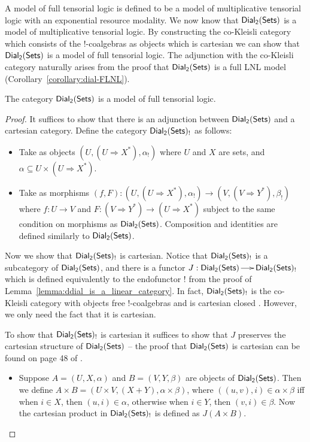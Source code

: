 A model of full tensorial logic is defined to be a model of
multiplicative tensorial logic with an exponential resource modality. We
now know that $\mathsf{Dial_2}(\mathsf{Sets})$ is a model of multiplicative tensorial logic.  By
constructing the co-Kleisli category which consists of the
$!$-coalgebras as objects which is cartesian we can show that $\mathsf{Dial_2}(\mathsf{Sets})$
is a model of full tensorial logic.  The adjunction with the co-Kleisli
category naturally arises from the proof that $\mathsf{Dial_2}(\mathsf{Sets})$ is a full LNL
model (Corollary~\ref{corollary:dial-FLNL}).
\begin{lemma}
  \label{lemma:full-tensorial-logic}
  The category $\mathsf{Dial_2}(\mathsf{Sets})$ is a model of full tensorial logic.
\end{lemma}
\begin{proof}
  It suffices to show that there is an adjunction between $\mathsf{Dial_2}(\mathsf{Sets})$ and
  a cartesian category.  Define the category $\mathsf{Dial_2}(\mathsf{Sets})_!$ as follows:
  \begin{itemize}
  \item Take as objects $(U , (U \Rightarrow X^*), \alpha_!)$
    where $U$ and $X$ are sets, and $\alpha \subseteq U \times (U \Rightarrow X^*)$.
    
  \item Take as morphisms $(f , F) : (U , (U \Rightarrow X^*),
    \alpha_!) \to (V , (V \Rightarrow Y^*), \beta_!)$ where $f : U \to
    V$ and $F : (V \Rightarrow Y^*) \to (U \Rightarrow X^*)$ subject
    to the same condition on morphisms as $\mathsf{Dial_2}(\mathsf{Sets})$.  Composition and
    identities are defined similarly to $\mathsf{Dial_2}(\mathsf{Sets})$.
  \end{itemize}
  
  Now we show that $\mathsf{Dial_2}(\mathsf{Sets})_!$ is cartesian.  Notice that $\mathsf{Dial_2}(\mathsf{Sets})_!$ is a
  subcategory of $\mathsf{Dial_2}(\mathsf{Sets})$, and there is a functor $J : \mathsf{Dial_2}(\mathsf{Sets}) \to
  \mathsf{Dial_2}(\mathsf{Sets})_!$ which is defined equivalently to the endofunctor $!$ from
  the proof of Lemma~\ref{lemma:ddial_is_a_linear_category}.  In fact,
  $\mathsf{Dial_2}(\mathsf{Sets})_!$ is the co-Kleisli category with objects free !-coalgebras
  and is cartesian closed \cite{dePaiva:1987}.  However, we only need
  the fact that it is cartesian.

  To show that $\mathsf{Dial_2}(\mathsf{Sets})_!$ is cartesian it suffices to show that $J$
  preserves the cartesian structure of $\mathsf{Dial_2}(\mathsf{Sets})$ -- the proof that
  $\mathsf{Dial_2}(\mathsf{Sets})$ is cartesian can be found on page 48 of \cite{dePaiva:1988}.
  \begin{itemize}
  \item Suppose $A = (U , X , \alpha)$ and $B = (V , Y , \beta)$ are
    objects of $\mathsf{Dial_2}(\mathsf{Sets})$. Then we define $A \times B = (U \times V, (X +
    Y), \alpha \times \beta)$, where $((u , v), i) \in \alpha \times
    \beta$ iff when $i \in X$, then $(u , i) \in \alpha$, otherwise
    when $i \in Y$, then $(v , i) \in \beta$.  Now the cartesian
    product in $\mathsf{Dial_2}(\mathsf{Sets})_!$ is defined as $J(A \times B)$.


\end{itemize}
\end{proof}
